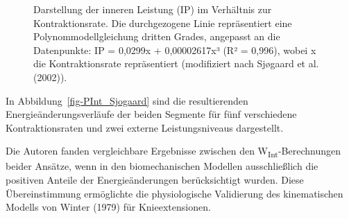 \documentclass[
  letterpaper,
  DIV=11]{scrartcl}
\begin{document}
\begin{figure}


\caption{\label{fig-Pint_Sjogaard_Modell}Darstellung der inneren
Leistung (IP) im Verhältnis zur Kontraktionsrate. Die durchgezogene
Linie repräsentiert eine Polynommodellgleichung dritten Grades,
angepasst an die Datenpunkte: IP = 0,0299x + 0,00002617x³ (R² = 0,996),
wobei x die Kontraktionsrate repräsentiert (modifiziert nach Sjøgaard et
al. (2002)).}

\end{figure}%

In Abbildung~\ref{fig-PInt_Sjogaard} sind die resultierenden
Energieänderungsverläufe der beiden Segmente für fünf verschiedene
Kontraktionsraten und zwei externe Leistungsniveaus dargestellt.

Die Autoren fanden vergleichbare Ergebnisse zwischen den
W\textsubscript{Int}-Berechnungen beider Ansätze, wenn in den
biomechanischen Modellen ausschließlich die positiven Anteile der
Energieänderungen berücksichtigt wurden. Diese Übereinstimmung
ermöglichte die physiologische Validierung des kinematischen Modells von
Winter (1979) für Knieextensionen.
\end{document}
